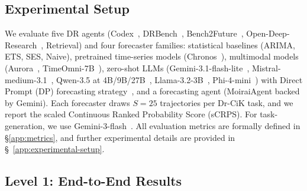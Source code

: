\documentclass[]{servicenow}
\begin{document}
\subsection{Experimental Setup}
We evaluate five DR agents (Codex~\citep{openai_codex_2026}, DRBench~\citep{abaskohi2025drbench}, Bench2Future~\citep{wildman2025bench}, Open-Deep-Research~\citep{langchain_open_deep_research}, Retrieval) and four forecaster families: statistical baselines (ARIMA, ETS, SES, Naive), pretrained time-series models (Chronos~\citep{ansari2024chronos}), multimodal models (Aurora~\citep{wu2025aurora}, TimeOmni-7B~\citep{guan2025timeomni}), zero-shot LLMs (Gemini-3.1-flash-lite~\citep{google_gemini_3_1_flash_lite_preview}, Mistral-medium-3.1~\citep{liu2026ministral}, Qwen-3.5 at 4B/9B/27B~\citep{qwen3.5}, Llama-3.2-3B~\citep{grattafiori2024llama}, Phi-4-mini~\citep{abdin2024phi}) with Direct Prompt (DP) forecasting strategy~\citep{williams2024context}, and a forecasting agent (MoiraiAgent backed by Gemini). 
Each forecaster draws $S{=}25$ trajectories per Dr-CiK task, and we report the scaled Continuous Ranked Probability Score (sCRPS). For task-generation, we use Gemini-3-flash~\citep{google_gemini_3_flash_preview}. All evaluation metrics are formally defined in \S\ref{app:metrics}, and further experimental details are provided in \S~\ref{app:experimental-setup}.


\subsection{Level 1: End-to-End Results}
\end{document}
